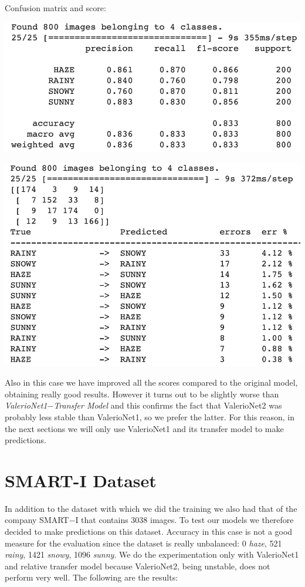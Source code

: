 \documentclass[12pt]{article}
\begin{document}
Confusion matrix and score: \newline
\begin{minipage}[c]{.5\textwidth}
   \centering
   \includegraphics[width=\textwidth]{pic12}
\end{minipage}
\hspace{1em}
\begin{minipage}[c]{.5\textwidth}
   \centering
   \includegraphics[width=\textwidth]{pic13}
\end{minipage}

Also in this case we have improved all the scores compared to the original model, obtaining really good results. However it turns out to be slightly worse than {\em ValerioNet1$-$Transfer Model} and this confirms the fact that ValerioNet2 was probably less stable than ValerioNet1, so we prefer the latter. For this reason, in the next sections we will only use ValerioNet1 and its transfer model to make predictions.

\newpage
\section{SMART-I Dataset}
In addition to the dataset with which we did the training we also had that of the company SMART$-$I that contains 3038 images. To test our models we therefore decided to make predictions on this dataset. Accuracy in this case is not a good measure for the evaluation since the dataset is really unbalanced: 0 {\em haze}, 521 {\em rainy}, 1421 {\em snowy}, 1096 {\em sunny}. We do the experimentation only with ValerioNet1 and relative transfer model because ValerioNet2, being unstable, does not perform very well. The following are the results:
\end{document}
